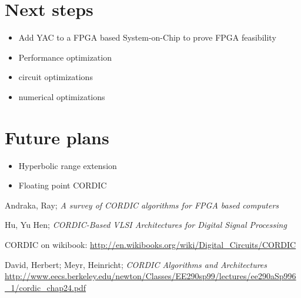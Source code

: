 \documentclass[a4paper, 12pt, notitlepage]{report}
\begin{document}
   \section{Next steps}
   \begin{itemize}
      \item Add YAC to a FPGA based System-on-Chip to prove 
            FPGA feasibility
      \item Performance optimization
         \item circuit optimizations
         \item numerical optimizations
   \end{itemize}

   \section{Future plans}
   \begin{itemize}
      \item Hyperbolic range extension
      \item Floating point CORDIC 
   \end{itemize}



\begin{thebibliography}{9}

  Andraka, Ray; \textit{A survey of CORDIC algorithms for FPGA based computers}

   Hu, Yu Hen; \textit{CORDIC-Based VLSI Architectures for Digital Signal Processing}

  CORDIC on wikibook: \url{http://en.wikibooks.org/wiki/Digital_Circuits/CORDIC}

   David, Herbert; Meyr, Heinricht; \textit{CORDIC Algorithms and Architectures} 
   \url{http://www.eecs.berkeley.edu/newton/Classes/EE290sp99/lectures/ee290aSp996_1/cordic_chap24.pdf}
\end{thebibliography}
\end{document}
